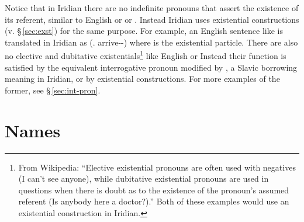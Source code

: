 Notice that in Iridian there are no indefinite pronouns that assert the
existence of its referent, similar to English  or 
or . Instead Iridian uses existential constructions (v.
\S\,\ref{sec:exst}) for the same purpose. For example, an English sentence like
 is translated in Iridian as 
(\Refl{}.\Acc{} \Exst{} arrive-\Av{}-\Ctp{}) where  is the existential
particle. There are also no elective and dubitative existentials\footnote{From
Wikipedia: ``Elective existential pronouns are often used with negatives (I
can't see anyone), while dubitative existential pronouns are used in questions
when there is doubt as to the existence of the pronoun's assumed referent (Is
anybody here a doctor?).'' Both of these examples would use an existential
construction in Iridian.} like English  or  Instead
their function is satisfied by the equivalent interrogative pronoun modified by
, a Slavic borrowing meaning  in Iridian, or by existential
constructions. For more examples of the former, see \S\,\ref{sec:int-pron}.

\section{Names}\label{sec:names}
